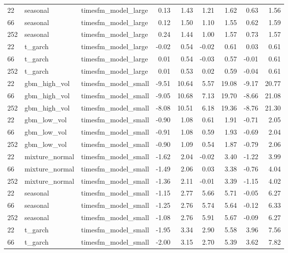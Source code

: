 {\begin{tabular}{lllrrrrrr}
\midrule
22 & seasonal & timesfm\_model\_large & 0.13 & 1.43 & 1.21 & 1.62 & 0.63 & 1.56 \\
66 & seasonal & timesfm\_model\_large & 0.12 & 1.50 & 1.10 & 1.55 & 0.62 & 1.59 \\
252 & seasonal & timesfm\_model\_large & 0.24 & 1.44 & 1.00 & 1.57 & 0.73 & 1.57 \\
\midrule
22 & t\_garch & timesfm\_model\_large & -0.02 & 0.54 & -0.02 & 0.61 & 0.03 & 0.61 \\
66 & t\_garch & timesfm\_model\_large & 0.01 & 0.54 & -0.03 & 0.57 & -0.01 & 0.61 \\
252 & t\_garch & timesfm\_model\_large & 0.01 & 0.53 & 0.02 & 0.59 & -0.04 & 0.61 \\
\midrule
22 & gbm\_high\_vol & timesfm\_model\_small & -9.51 & 10.64 & 5.57 & 19.08 & -9.17 & 20.77 \\
66 & gbm\_high\_vol & timesfm\_model\_small & -9.05 & 10.68 & 7.13 & 19.70 & -8.66 & 21.08 \\
252 & gbm\_high\_vol & timesfm\_model\_small & -8.08 & 10.51 & 6.18 & 19.36 & -8.76 & 21.30 \\
\midrule
22 & gbm\_low\_vol & timesfm\_model\_small & -0.90 & 1.08 & 0.61 & 1.91 & -0.71 & 2.05 \\
66 & gbm\_low\_vol & timesfm\_model\_small & -0.91 & 1.08 & 0.59 & 1.93 & -0.69 & 2.04 \\
252 & gbm\_low\_vol & timesfm\_model\_small & -0.90 & 1.09 & 0.54 & 1.87 & -0.79 & 2.06 \\
\midrule
22 & mixture\_normal & timesfm\_model\_small & -1.62 & 2.04 & -0.02 & 3.40 & -1.22 & 3.99 \\
66 & mixture\_normal & timesfm\_model\_small & -1.49 & 2.06 & 0.03 & 3.38 & -0.76 & 4.04 \\
252 & mixture\_normal & timesfm\_model\_small & -1.36 & 2.11 & -0.01 & 3.39 & -1.15 & 4.02 \\
\midrule
22 & seasonal & timesfm\_model\_small & -1.15 & 2.77 & 5.66 & 5.71 & -0.05 & 6.27 \\
66 & seasonal & timesfm\_model\_small & -1.25 & 2.76 & 5.74 & 5.64 & -0.12 & 6.33 \\
252 & seasonal & timesfm\_model\_small & -1.08 & 2.76 & 5.91 & 5.67 & -0.09 & 6.27 \\
\midrule
22 & t\_garch & timesfm\_model\_small & -1.95 & 3.34 & 2.90 & 5.58 & 3.96 & 7.56 \\
66 & t\_garch & timesfm\_model\_small & -2.00 & 3.15 & 2.70 & 5.39 & 3.62 & 7.82 \\

\end{tabular}}
